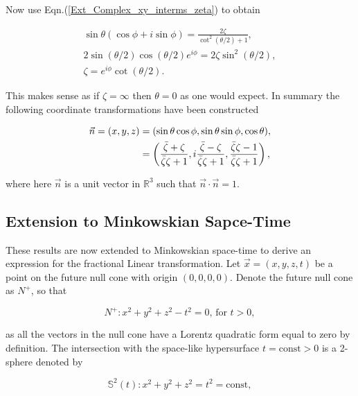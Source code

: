 \noindent Now use Eqn.(\ref{Ext_Complex_xy_interms_zeta}) to obtain

\begin{gather*}
\sin{\theta}(\cos{\phi} +i \sin{\phi}) = \frac{2\zeta}{\cot^2{\left(\theta/2\right)} + 1 }, \\
2\sin{\left(\theta/2\right)}\cos{\left(\theta/2\right)}e^{i\phi} = 2\zeta \sin^2{\left(\theta/2\right)}, \\
\zeta = e^{i\phi}\cot{\left(\theta/2\right)}. 
\end{gather*}

\noindent This makes sense as if $\zeta = \infty$ then $\theta = 0$ as one would expect. In summary the following coordinate transformations have been constructed

\begin{align}
\vec{n} = (x, y, z) & = (\sin{\theta}\cos{\phi}, \sin{\theta}\sin{\phi}, \cos{\theta}), \\ \label{Ext_Complex_Vec_n}
&
\begin{Huge}
                     = \left( \frac{\bar{\zeta} + \zeta}{\bar{\zeta}\zeta + 1}  ,i\frac{\bar{\zeta} - \zeta}{\bar{\zeta}\zeta + 1}, \frac{\bar{\zeta}\zeta - 1}{\bar{\zeta}\zeta + 1}  \right),
\end{Huge}
\end{align}

\noindent where here $\vec{n}$ is a unit vector in $\mathbb{R}^3$ such that $\vec{n} \cdot \vec{n} = 1$.

\subsection{Extension to Minkowskian Sapce-Time}\label{Fractional_Section_Extension_to_Minkowskian}

These results are now extended to Minkowskian space-time to derive an expression for the fractional Linear transformation. Let $\vec{x} = (x,y,z,t)$ be a point on the future null cone with origin $(0,0,0,0)$. Denote the future null cone as $N^{+}$, so that 

\begin{equation*}
N^+ : x^2 + y^2 + z^2 - t^2 = 0 \text{,  for  } t>0,
\end{equation*}

\noindent as all the vectors in the null cone have a Lorentz quadratic form equal to zero by definition. The intersection with the space-like hypersurface $t = \text{const}>0$ is a 2-sphere denoted by 

\begin{equation}\label{Ext_Complex_2Sphere_Definition}
\mathbb{S}^2 (t) : x^2 + y^2 + z^2 = t^2 = \text{const}, 
\end{equation}

